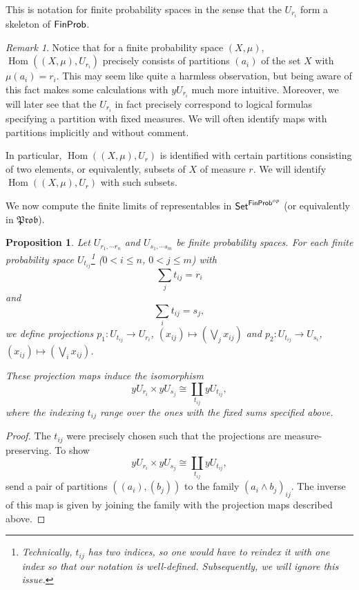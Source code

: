 \documentclass[a4paper]{amsproc}
\theoremstyle{plain}
\newtheorem{proposition}[theorem]{Proposition}
\theoremstyle{definition}
\theoremstyle{remark}
\newtheorem{remark}[theorem]{Remark}
\numberwithin{equation}{section}
\DeclareMathOperator{\Hom}{Hom}
\newcommand{\y}{\textit{y}}
\newcommand{\Set}{\textup{\textsf{Set}}}
\newcommand{\FinProb}{\textup{\textsf{FinProb}}}
\newcommand{\Prob}{\mathfrak{Prob}}
\begin{document}
This is notation for finite probability spaces in the sense that the $U_{r_i}$ form a skeleton of $\FinProb$.

\begin{remark}\label{classifying_partitions}
    Notice that for a finite probability space $(X,\mu)$, $\Hom((X,\mu), U_{r_i})$ precisely consists of partitions $(a_i)$ of the set $X$ with $\mu(a_i) = r_i$. This may seem like quite a harmless observation, but being aware of this fact makes some calculations with $\y U_{r_i}$ much more intuitive. Moreover, we will later see that the $U_{r_i}$ in fact precisely correspond to logical formulas specifying a partition with fixed measures. We will often identify maps with partitions implicitly and without comment.

    In particular, $\Hom((X,\mu), U_r)$ is identified with certain partitions consisting of two elements, or equivalently, subsets of $X$ of measure $r$. We will identify $\Hom((X,\mu), U_r)$ with such subsets.

\end{remark}

We now compute the finite limits of representables in $\Set^{\FinProb^{op}}$ (or equivalently in $\Prob$).

\begin{proposition} \label{multi-product}
    Let $U_{r_1, \cdots r_n}$ and $U_{s_1, \cdots s_m}$ be finite probability spaces. For each finite probability space $U_{t_{ij}}$\footnote{Technically, $t_{ij}$ has two indices, so one would have to reindex it with one index so that our notation is well-defined. Subsequently, we will ignore this issue.} ($0 < i \leq n$, $0 < j \leq m$) with
    \[
        \sum_j t_{ij} = r_i
    \]
    and
    \[
        \sum_i t_{ij} = s_j ,
    \]
    we define projections $p_1: U_{t_{ij}} \to U_{r_i}$, $(x_{ij}) \mapsto (\bigvee_j x_{ij})$ and $p_2: U_{t_{ij}} \to U_{s_i}$, $(x_{ij}) \mapsto (\bigvee_i x_{ij})$.

    These projection maps induce the isomorphism
    \[
    \y U_{r_i} \times \y U_{s_j} \cong \coprod_{t_{ij}} \y U_{t_{ij}} ,
    \]
    where the indexing $t_{ij}$ range over the ones with the fixed sums specified above.
\end{proposition}
\begin{proof}
    The $t_{ij}$ were precisely chosen such that the projections are measure-preserving. To show
    \[
    \y U_{r_i} \times \y U_{s_j} \cong \coprod_{t_{ij}} \y U_{t_{ij}} ,
    \]
    send a pair of partitions $((a_i),(b_j))$ to the family $(a_i \wedge b_j)_{ij}$. The inverse of this map is given by joining the family with the projection maps described above.
\end{proof}
\end{document}
